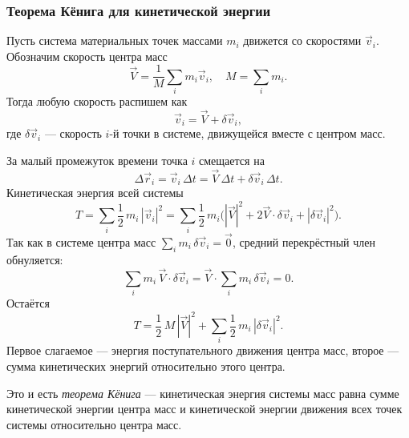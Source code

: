 \documentclass[12pt, a4paper]{article}%
\begin{document}
\subsubsection*{Теорема Кёнига для кинетической энергии}
Пусть система материальных точек массами $m_i$ движется со скоростями $\vec v_i$. Обозначим скорость центра масс
\[
\vec V = \frac{1}{M}\sum_i m_i\vec v_i,
\quad
M = \sum_i m_i.
\]
Тогда любую скорость распишем как
\[
\vec v_i = \vec V + \delta\vec v_i,
\]
где $\delta\vec v_i$ — скорость $i$-й точки в системе, движущейся вместе с центром масс.

За малый промежуток времени точка $i$ смещается на
\[
\Delta\vec r_i = \vec v_i\,\Delta t
= \vec V\,\Delta t + \delta\vec v_i\,\Delta t.
\]
Кинетическая энергия всей системы
\[
T = \sum_i \frac12\,m_i\,|\vec v_i|^2
= \sum_i \frac12\,m_i\bigl(|\vec V|^2 + 2\vec V\cdot\delta\vec v_i + |\delta\vec v_i|^2\bigr).
\]
Так как в системе центра масс $\sum_i m_i\,\delta\vec v_i=\vec 0$, средний перекрёстный член обнуляется:
\[
\sum_i m_i\,\vec V\cdot\delta\vec v_i
= \vec V\cdot\sum_i m_i\,\delta\vec v_i
= 0.
\]
Остаётся
\[
T = \frac12\,M\,|\vec V|^2
+ \sum_i \frac12\,m_i\,|\delta\vec v_i|^2.
\]
Первое слагаемое — энергия поступательного движения центра масс, второе — сумма кинетических энергий относительно этого центра.

Это и есть \textit{теорема Кёнига} --- кинетическая энергия системы масс равна сумме кинетической энергии центра масс и кинетической энергии движения всех точек системы относительно центра масс.
\end{document}
